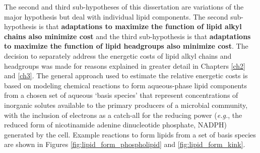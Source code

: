 The second and third sub-hypotheses of this dissertation are variations of the major hypothesis but deal with individual lipid components. The second sub-hypothesis is that \textbf{adaptations to maximize the function of lipid alkyl chains also minimize cost} and the third sub-hypothesis is that \textbf{adaptations to maximize the function of lipid headgroups also minimize cost}. The decision to separately address the energetic costs of lipid alkyl chains and headgroups was made for reasons explained in greater detail in Chapters \ref{ch2} and \ref{ch3}. The general approach used to estimate the relative energetic costs is based on modeling chemical reactions to form aqueous-phase lipid components from a chosen set of aqueous `basis species' that represent concentrations of inorganic solutes available to the primary producers of a microbial community, with the inclusion of electrons as a catch-all for the reducing power (\textit{e.g.}, the reduced form of nicotinamide adenine dinucleotide phosphate, NADPH) generated by the cell. Example reactions to form lipids from a set of basis species are shown in Figures \ref{fig:lipid_form_phospholipid} and \ref{fig:lipid_form_kink}.
